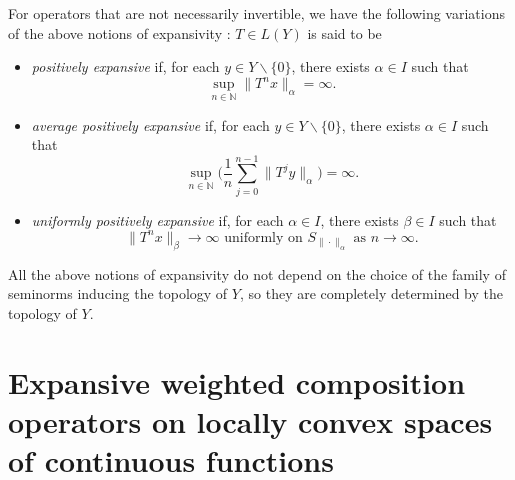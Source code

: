 \documentclass[12pt]{article}
\theoremstyle{plain}
\theoremstyle{definition}
\newcommand{\N}{\mathbb{N}} %
\begin{document}
For operators that are not necessarily invertible, we have the following variations of the above notions of expansivity
\cite{BerCarDarFavPer25,BerMarRod}: $T \in L(Y)$ is said to be
\begin{itemize}
\item {\em positively expansive} if, for each $y \in Y \backslash \{0\}$, there exists $\alpha \in I$ such that 
  \[
  \sup_{n \in \N} \|T^n x\|_\alpha = \infty.
  \]
\item {\em average positively expansive} if, for each $y \in Y \backslash \{0\}$, there exists $\alpha \in I$ such that
\[
\sup_{n \in \N} \Big(\frac{1}{n} \sum_{j=0}^{n-1} \|T^j y\|_\alpha \Big) = \infty.
\]
\item {\em uniformly positively expansive} if, for each $\alpha \in I$, there exists $\beta \in I$ such that
\[
\|T^n x\|_\beta \to \infty \text{ uniformly on } S_{\|\cdot\|_\alpha} \text{ as } n \to \infty.
\]
\end{itemize}

All the above notions of expansivity do not depend on the choice of the family of seminorms inducing the topology of $Y$,
so they are completely determined by the topology of $Y$.


\section{Expansive weighted composition operators on locally convex spaces of continuous functions}\label{S-ExpCFS}
\end{document}
